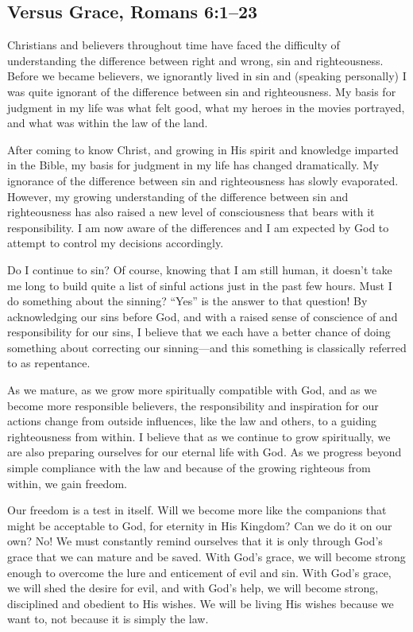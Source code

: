 \documentclass[12pt]{memoir}
\begin{document}
\subsection[Versus Grace]{Versus Grace, Romans 6:1--23}

Christians and believers throughout time have faced the difficulty
of understanding the difference between right and wrong, sin and righteousness.
Before we became believers, we ignorantly lived in sin and (speaking
personally) I was quite ignorant of the difference between sin and
righteousness. My basis for judgment in my life was what felt good,
what my heroes in the movies portrayed, and what was within the law
of the land.

After coming to know Christ, and growing in His spirit
and knowledge imparted in the Bible, my basis for judgment in my life
has changed dramatically. My ignorance of the difference between sin
and righteousness has slowly evaporated. However, my growing understanding
of the difference between sin and righteousness has also raised a
new level of consciousness that bears with it responsibility. I am
now aware of the differences and I am expected by God to attempt
to control my decisions accordingly.

Do I continue to sin? Of course, knowing that I am still human, it
doesn't take me long to build quite a list of sinful actions just
in the past few hours. Must I do something about the sinning? ``Yes'' is the answer to that question! By acknowledging our sins before God, and with a raised
sense of conscience of and responsibility for our sins, I believe that
we each have a better chance of doing something about correcting our
sinning---and this something is classically referred to as repentance.

As we mature, as we grow more spiritually compatible with God, and
as we become more responsible believers, the responsibility
and inspiration for our actions change from outside influences, like
the law and others, to a guiding righteousness from within.
I believe that as we continue to grow spiritually, we are also preparing
ourselves for our eternal life with God. As we progress beyond simple compliance with the law and because of the growing righteous from within, we gain freedom.

Our freedom is a test in itself. Will we become more like the companions that might be acceptable to God, for eternity in His Kingdom? Can we do it on our own? No! We must constantly remind ourselves that it is only through God's grace that we can mature and be saved. With
God's grace, we will become strong enough to overcome the lure and
enticement of evil and sin. With God's grace, we will shed the desire
for evil, and with God's help, we will become strong, disciplined
and obedient to His wishes. We will be living His wishes because we
want to, not because it is simply the law.
\end{document}
